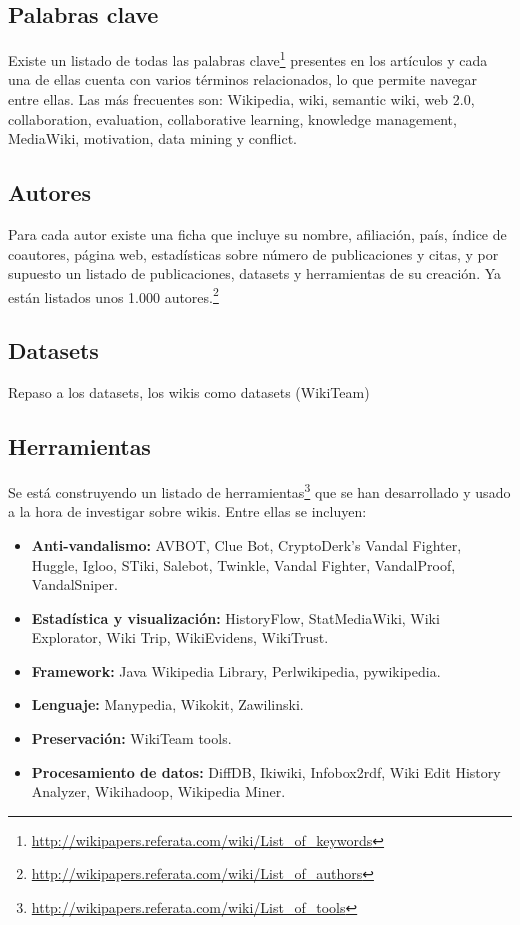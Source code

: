 \documentclass[11pt,twocolumn]{article}
\begin{document}
\subsection{Palabras clave}
Existe un listado de todas las palabras clave\footnote{\href{http://wikipapers.referata.com/wiki/List_of_keywords}{http://wikipapers.referata.com/wiki/List\_of\_keywords}} presentes en los artículos y cada una de ellas cuenta con varios términos relacionados, lo que permite navegar entre ellas. Las más frecuentes son: Wikipedia, wiki, semantic wiki, web 2.0, collaboration, evaluation, collaborative learning, knowledge management, MediaWiki, motivation, data mining y conflict. 

\subsection{Autores}
Para cada autor existe una ficha que incluye su nombre, afiliación, país, índice de coautores, página web, estadísticas sobre número de publicaciones y citas, y por supuesto un listado de publicaciones, datasets y herramientas de su creación. Ya están listados unos 1.000 autores.\footnote{\href{http://wikipapers.referata.com/wiki/List_of_authors}{http://wikipapers.referata.com/wiki/List\_of\_authors}}

\subsection{Datasets}
Repaso a los datasets, los wikis como datasets (WikiTeam)

\subsection{Herramientas}
Se está construyendo un listado de herramientas\footnote{\href{http://wikipapers.referata.com/wiki/List_of_tools}{http://wikipapers.referata.com/wiki/List\_of\_tools}} que se han desarrollado y usado a la hora de investigar sobre wikis. Entre ellas se incluyen:

\begin{itemize}
\item \textbf{Anti-vandalismo:} AVBOT, Clue Bot, CryptoDerk's Vandal Fighter, Huggle, Igloo, STiki, Salebot, Twinkle, Vandal Fighter, VandalProof, VandalSniper.
\item \textbf{Estadística y visualización:} HistoryFlow, StatMediaWiki, Wiki Explorator, Wiki Trip, WikiEvidens, WikiTrust.
\item \textbf{Framework:} Java Wikipedia Library, Perlwikipedia, pywikipedia.
\item \textbf{Lenguaje:} Manypedia, Wikokit, Zawilinski.
\item \textbf{Preservación:} WikiTeam tools.
\item \textbf{Procesamiento de datos:} DiffDB, Ikiwiki, Infobox2rdf, Wiki Edit History Analyzer, Wikihadoop, Wikipedia Miner.
\end{itemize}
\end{document}
